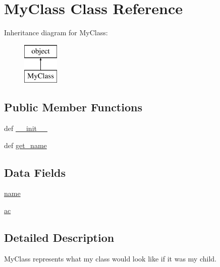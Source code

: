 \hypertarget{classmypkg_1_1_my_class}{\section{My\-Class Class Reference}
\label{classmypkg_1_1_my_class}
}
Inheritance diagram for My\-Class\-:\begin{figure}[H]
\begin{center}
\leavevmode
\includegraphics[height=2.000000cm]{classmypkg_1_1_my_class}
\end{center}
\end{figure}
\subsection*{Public Member Functions}
\begin{DoxyCompactItemize}
\item 
def \hyperlink{classmypkg_1_1_my_class_ac775ee34451fdfa742b318538164070e}{\-\_\-\-\_\-init\-\_\-\-\_\-}
\item 
def \hyperlink{classmypkg_1_1_my_class_a2f3160d6b4e517398ca3f9e51b260bb7}{get\-\_\-name}
\end{DoxyCompactItemize}
\subsection*{Data Fields}
\begin{DoxyCompactItemize}
\item 
\hyperlink{classmypkg_1_1_my_class_ab74e6bf80237ddc4109968cedc58c151}{name}
\item 
\hyperlink{classmypkg_1_1_my_class_a9063eb76c0cc024f54d08e4afdf284a3}{ac}
\end{DoxyCompactItemize}


\subsection{Detailed Description}
\begin{DoxyVerb}MyClass represents what my class would look like if it was my child.\end{DoxyVerb}
 

